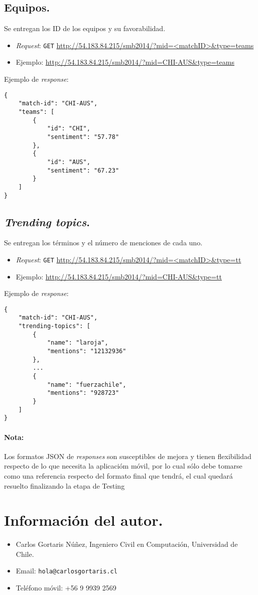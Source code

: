\documentclass[11pt,spanish]{article}
\begin{document}
\subsection{Equipos.}
Se entregan los ID de los equipos y su favorabilidad.
\begin{itemize}
    \item \emph{Request}: \texttt{GET} \url{http://54.183.84.215/smb2014/?mid=<matchID>&type=teams}
    \item Ejemplo: \url{http://54.183.84.215/smb2014/?mid=CHI-AUS&type=teams}
\end{itemize}

Ejemplo de \emph{response}:
\begin{lstlisting}
{
    "match-id": "CHI-AUS",
    "teams": [
        {
            "id": "CHI",
            "sentiment": "57.78"
        },
        {
            "id": "AUS",
            "sentiment": "67.23"
        }
    ]
}
\end{lstlisting}

\subsection{\emph{Trending topics}.}
Se entregan los términos y el número de menciones de cada uno.
\begin{itemize}
    \item \emph{Request}: \texttt{GET} \url{http://54.183.84.215/smb2014/?mid=<matchID>&type=tt}
    \item Ejemplo: \url{http://54.183.84.215/smb2014/?mid=CHI-AUS&type=tt}
\end{itemize}

Ejemplo de \emph{response}:
\begin{lstlisting}
{
    "match-id": "CHI-AUS",
    "trending-topics": [
        {
            "name": "laroja",
            "mentions": "12132936"
        },
        ...
        {
            "name": "fuerzachile",
            "mentions": "928723"
        }                    
    ]
}
\end{lstlisting}

\paragraph{Nota:}
Los formatos JSON de \emph{responses} son susceptibles de mejora y tienen flexibilidad respecto de lo que necesita la aplicacióm móvil, por lo cual sólo debe tomarse como una referencia respecto del formato final que tendrá, el cual quedará resuelto finalizando la etapa de Testing

\section{Información del autor.}
\begin{itemize}
\item Carlos Gortaris Núñez, Ingeniero Civil en Computación, Universidad de Chile.
\item Email: \texttt{hola@carlosgortaris.cl}
\item Teléfono móvil: +56 9 9939 2569
\end{itemize}



\end{document}
